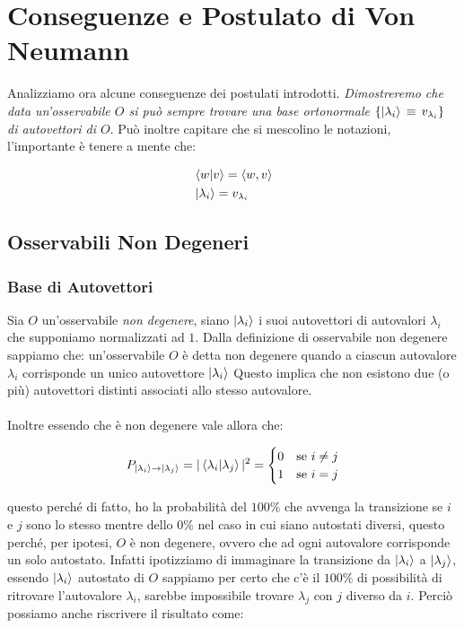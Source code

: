 \section{Conseguenze e Postulato di Von Neumann}
	
	Analizziamo ora alcune conseguenze dei postulati introdotti. \textit{Dimostreremo che data un'osservabile $O$ si può sempre trovare una base ortonormale $\qty{\ket{\lambda_i} \, \equiv \, v_{\lambda_i}  }$ di autovettori di $O$}. Può inoltre capitare che si mescolino le notazioni, l'importante è tenere a mente che:
	
\begin{align*}
	& \braket{w}{v} = \langle w, v \rangle \\
	& \ket{\lambda_i} = v_{\lambda_i}
\end{align*}
	
\subsection{Osservabili Non Degeneri}

\subsubsection{Base di Autovettori}
	
	Sia $O$ un'osservabile \textit{non degenere}, siano $\ket{\lambda_i}$ i suoi autovettori di autovalori $\lambda_i$ che supponiamo normalizzati ad $1$. Dalla definizione di osservabile non degenere sappiamo che: un'osservabile $O$ è detta non degenere quando a ciascun autovalore $\lambda_i$ corrisponde un unico autovettore $\ket{\lambda_i}$ Questo implica che non esistono due (o più) autovettori distinti associati allo stesso autovalore.
	\\
	\\
	Inoltre essendo che è non degenere vale allora che:

\begin{align*}
	P_{\ket{\lambda_i} \to \ket{\lambda_j}} = |\braket{\lambda_i}{\lambda_j}|^2 = \begin{cases}
0 & \text{se } i \neq j \\
1 & \text{se } i = j
\end{cases}
\end{align*}

	questo perché di fatto, ho la probabilità del $100\%$ che avvenga la transizione se $i$ e $j$ sono lo stesso mentre dello $0\%$ nel caso in cui siano autostati diversi, questo perché, per ipotesi, $O$ è non degenere, ovvero che ad ogni autovalore corrisponde un solo autostato. Infatti ipotizziamo di immaginare la transizione da $\ket{\lambda_i}$  a $\ket{\lambda_j}$, essendo $\ket{\lambda_i}$ autostato di $O$ sappiamo per certo che c'è il $100\%$ di possibilità di ritrovare l'autovalore $\lambda_i$, sarebbe impossibile trovare $\lambda_j$ con $j$ diverso da $i$. Perciò possiamo anche riscrivere il risultato come:
	
